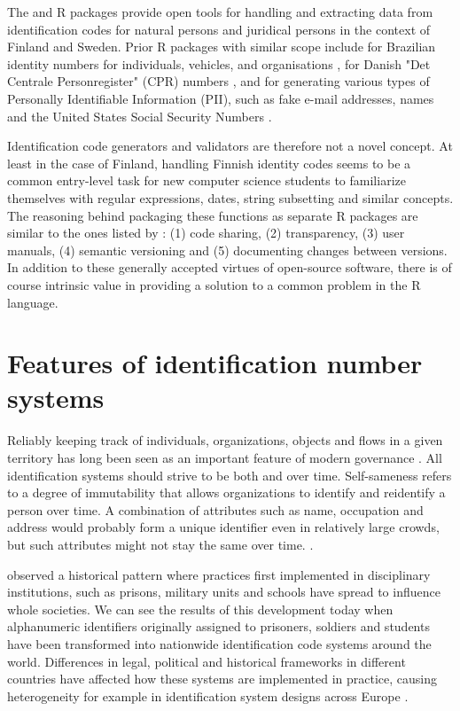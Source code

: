 The  and  R packages provide open tools for handling and extracting data from identification codes for natural persons and juridical persons in the context of Finland and Sweden. Prior R packages with similar scope include  for Brazilian identity numbers for individuals, vehicles, and organisations \citep{numbersbr},  for Danish "Det Centrale Personregister" (CPR) numbers \citep{cprr}, and  for generating various types of Personally Identifiable Information (PII), such as fake e-mail addresses, names and the United States Social Security Numbers \citep{generator}.

Identification code generators and validators are therefore not a novel concept. At least in the case of Finland, handling Finnish identity codes seems to be a common entry-level task for new computer science students to familiarize themselves with regular expressions, dates, string subsetting and similar concepts. The reasoning behind packaging these functions as separate R packages are similar to the ones listed by \citet{wickham2022}: (1) code sharing, (2) transparency, (3) user manuals, (4) semantic versioning and (5) documenting changes between versions. In addition to these generally accepted virtues of open-source software, there is of course intrinsic value in providing a solution to a common problem in the R language.

\section{Features of identification number systems}

Reliably keeping track of individuals, organizations, objects and flows in a given territory has long been seen as an important feature of modern governance \citep{dodge2005}. All identification systems should strive to be both  and  over time. Self-sameness refers to a degree of immutability that allows organizations to identify and reidentify a person over time. A combination of attributes such as name, occupation and address would probably form a unique identifier even in relatively large crowds, but such attributes might not stay the same over time. \citep{brensinger2021}.

\citet[115-120]{foucault7778} observed a historical pattern where practices first implemented in disciplinary institutions, such as prisons, military units and schools have spread to influence whole societies. We can see the results of this development today when alphanumeric identifiers originally assigned to prisoners, soldiers and students have been transformed into nationwide identification code systems around the world. Differences in legal, political and historical frameworks in different countries have affected how these systems are implemented in practice, causing heterogeneity for example in identification system designs across Europe \citep{otjacques2007}. 

